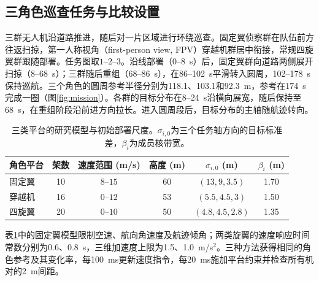 \documentclass[UTF8,a4paper,11pt,fontset=none]{ctexart}
\begin{document}
\subsection{三角色巡查任务与比较设置}\label{sec:simulation-setup}
三群无人机沿道路推进，随后对一片区域进行环绕巡查。固定翼侦察群在队伍前方往返扫掠，第一人称视角（first-person view, FPV）穿越机群居中衔接，常规四旋翼群跟随部署。任务图取$1$--$2$--$3$。沿线部署（0--8~s）后，固定翼群向道路两侧展开扫掠（8--68~s）；三群随后重组（68--86~s），在86--102~s平滑转入圆周，102--178~s保持巡航。三个角色的圆周参考半径分别为118.1、103.1和92.3~m，参考在174~s完成一圈（图\ref{fig:mission}）。各群的目标分布在8--24~s沿横向展宽，随后保持至68~s，在重组阶段沿前进方向拉长。进入圆周段后，目标分布的主轴随航迹转向。

\begin{table}[htbp]\centering\small
\caption{三类平台的研究模型与初始部署尺度。$\sigma_{i,0}$为三个任务轴方向的目标标准差，$\beta_i$为成员核带宽。}\label{tab:platforms}
\begin{tabular}{lccccc}\toprule
角色平台 & 架数 & 速度范围 (m/s) & 高度 (m) & $\sigma_{i,0}$ (m) & $\beta_i$ (m)\\\midrule
固定翼 & 10 & $8$--$15$ & 60 & $(13,9,3.5)$ & 1.70\\
穿越机 & 16 & $0$--$12$ & 53 & $(5.5,4.5,3)$ & 1.50\\
四旋翼 & 20 & $0$--$10$ & 50 & $(4.8,4.5,2.8)$ & 1.35\\\bottomrule
\end{tabular}\end{table}

表\ref{tab:platforms}中的固定翼模型限制空速、航向角速度及航迹倾角；两类旋翼的速度响应时间常数分别为0.6、0.8~s，三维加速度上限为1.5、1.0~m/s$^2$。三种方法获得相同的角色参考及其变化率，每100~ms更新速度指令，每20~ms施加平台约束并检查所有机对的2~m间距。
\end{document}
